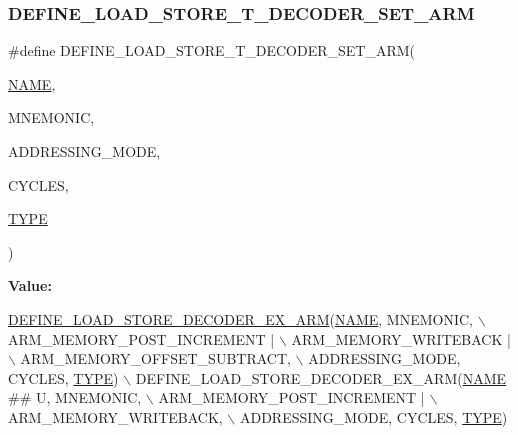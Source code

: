 \subsubsection{\texorpdfstring{D\+E\+F\+I\+N\+E\+\_\+\+L\+O\+A\+D\+\_\+\+S\+T\+O\+R\+E\+\_\+\+T\+\_\+\+D\+E\+C\+O\+D\+E\+R\+\_\+\+S\+E\+T\+\_\+\+A\+RM}{DEFINE\_LOAD\_STORE\_T\_DECODER\_SET\_ARM}}
{\footnotesize\ttfamily \#define D\+E\+F\+I\+N\+E\+\_\+\+L\+O\+A\+D\+\_\+\+S\+T\+O\+R\+E\+\_\+\+T\+\_\+\+D\+E\+C\+O\+D\+E\+R\+\_\+\+S\+E\+T\+\_\+\+A\+RM(\begin{DoxyParamCaption}\item[{}]{\mbox{\hyperlink{inflate_8h_a164ea0159d5f0b5f12a646f25f99eceaa67bc2ced260a8e43805d2480a785d312}{N\+A\+ME}},  }\item[{}]{M\+N\+E\+M\+O\+N\+IC,  }\item[{}]{A\+D\+D\+R\+E\+S\+S\+I\+N\+G\+\_\+\+M\+O\+DE,  }\item[{}]{C\+Y\+C\+L\+ES,  }\item[{}]{\mbox{\hyperlink{inflate_8h_a164ea0159d5f0b5f12a646f25f99eceaab47ea8bb955afd0adc0ef98517dd6084}{T\+Y\+PE}} }\end{DoxyParamCaption})}

{\bfseries Value\+:}
\begin{DoxyCode}
\mbox{\hyperlink{decoder-arm_8c_a5d6d802380fe63152e39d49de3ceb848}{DEFINE\_LOAD\_STORE\_DECODER\_EX\_ARM}}(\mbox{\hyperlink{inflate_8h_a164ea0159d5f0b5f12a646f25f99eceaa67bc2ced260a8e43805d2480a785d312}{NAME}}, MNEMONIC, \(\backslash\)
        ARM\_MEMORY\_POST\_INCREMENT | \(\backslash\)
        ARM\_MEMORY\_WRITEBACK | \(\backslash\)
        ARM\_MEMORY\_OFFSET\_SUBTRACT, \(\backslash\)
        ADDRESSING\_MODE, CYCLES, \mbox{\hyperlink{inflate9_8h_a164ea0159d5f0b5f12a646f25f99eceaab47ea8bb955afd0adc0ef98517dd6084}{TYPE}}) \(\backslash\)
    DEFINE\_LOAD\_STORE\_DECODER\_EX\_ARM(\mbox{\hyperlink{inflate_8h_a164ea0159d5f0b5f12a646f25f99eceaa67bc2ced260a8e43805d2480a785d312}{NAME}} ## U, MNEMONIC, \(\backslash\)
        ARM\_MEMORY\_POST\_INCREMENT | \(\backslash\)
        ARM\_MEMORY\_WRITEBACK, \(\backslash\)
        ADDRESSING\_MODE, CYCLES, \mbox{\hyperlink{inflate9_8h_a164ea0159d5f0b5f12a646f25f99eceaab47ea8bb955afd0adc0ef98517dd6084}{TYPE}})
\end{DoxyCode}
\mbox{\label{decoder-arm_8c_a039f026f1a58a81355107a2d6c7de92c}} 
